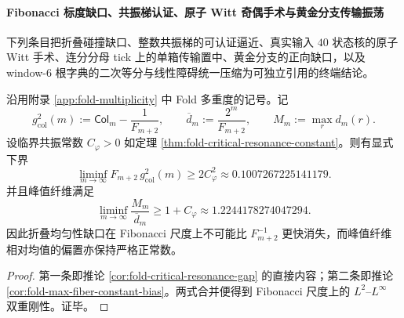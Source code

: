 \paragraph{Fibonacci 标度缺口、共振梯认证、原子 Witt 奇偶手术与黄金分支传输振荡}
下列条目把折叠碰撞缺口、整数共振梯的可认证逼近、真实输入 \(40\) 状态核的原子 Witt 手术、连分分母 tick 上的单箱传输置中、黄金分支的正向缺口，以及 window-\(6\) 根字典的二次等分与线性障碍统一压缩为可独立引用的终端结论。

\begin{theorem}\label{thm:xi-fold-fibonacci-collision-gap-positive-floor}
沿用附录 \ref{app:fold-multiplicity} 中 Fold 多重度的记号。记
\[
g_{\mathrm{col}}^2(m):=\mathsf{Col}_m-\frac{1}{F_{m+2}},
\qquad
\overline d_m:=\frac{2^m}{F_{m+2}},
\qquad
M_m:=\max_r d_m(r).
\]
设临界共振常数 \(C_\varphi>0\) 如定理 \ref{thm:fold-critical-resonance-constant}。则有显式下界
\[
\boxed{\;
\liminf_{m\to\infty}F_{m+2}\,g_{\mathrm{col}}^2(m)
\ge
2C_\varphi^2
\approx 0.1007267225141179.\;}
\]
并且峰值纤维满足
\[
\boxed{\;
\liminf_{m\to\infty}\frac{M_m}{\overline d_m}
\ge
1+C_\varphi
\approx 1.2244178274047294.\;}
\]
因此折叠均匀性缺口在 Fibonacci 尺度上不可能比 \(F_{m+2}^{-1}\) 更快消失，而峰值纤维相对均值的偏置亦保持严格正常数。
\end{theorem}
\begin{proof}
第一条即推论 \ref{cor:fold-critical-resonance-gap} 的直接内容；第二条即推论 \ref{cor:fold-max-fiber-constant-bias}。两式合并便得到 Fibonacci 尺度上的 \(L^2\)--\(L^\infty\) 双重刚性。证毕。
\end{proof}

